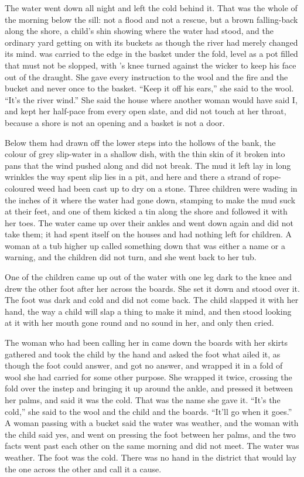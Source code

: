 
The water went down all night and left the cold behind it. That was the whole of the morning below the sill: not a flood and not a rescue, but a brown falling-back along the shore, a child's shin showing where the water had stood, and the ordinary yard getting on with its buckets as though the river had merely changed its mind.  was carried to the edge in the basket under the fold, level as a pot filled that must not be slopped, with 's knee turned against the wicker to keep his face out of the draught. She gave every instruction to the wool and the fire and the bucket and never once to the basket. “Keep it off his ears,” she said to the wool. “It's the river wind.” She said the house where another woman would have said I, and kept her half-pace from every open slate, and did not touch  at her throat, because a shore is not an opening and a basket is not a door.

Below them  had drawn off the lower steps into the hollows of the bank, the colour of grey slip-water in a shallow dish, with the thin skin of it broken into pans that the wind pushed along and did not break. The mud it left lay in long wrinkles the way spent slip lies in a pit, and here and there a strand of rope-coloured weed had been cast up to dry on a stone. Three children were wading in the inches of it where the water had gone down, stamping to make the mud suck at their feet, and one of them kicked a tin along the shore and followed it with her toes. The water came up over their ankles and went down again and did not take them; it had spent itself on the houses and had nothing left for children. A woman at a tub higher up called something down that was either a name or a warning, and the children did not turn, and she went back to her tub.

One of the children came up out of the water with one leg dark to the knee and drew the other foot after her across the boards. She set it down and stood over it. The foot was dark and cold and did not come back. The child slapped it with her hand, the way a child will slap a thing to make it mind, and then stood looking at it with her mouth gone round and no sound in her, and only then cried.

The woman who had been calling her in came down the boards with her skirts gathered and took the child by the hand and asked the foot what ailed it, as though the foot could answer, and got no answer, and wrapped it in a fold of wool she had carried for some other purpose. She wrapped it twice, crossing the fold over the instep and bringing it up around the ankle, and pressed it between her palms, and said it was the cold. That was the name she gave it. “It's the cold,” she said to the wool and the child and the boards. “It'll go when it goes.” A woman passing with a bucket said the water was weather, and the woman with the child said yes, and went on pressing the foot between her palms, and the two facts went past each other on the same morning and did not meet. The water was weather. The foot was the cold. There was no hand in the district that would lay the one across the other and call it a cause.

